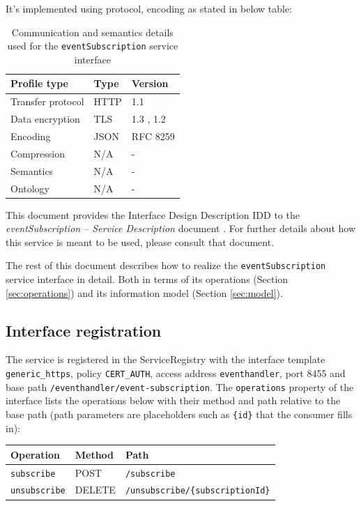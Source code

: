 \documentclass[a4paper]{arrowhead}
\begin{document}
It's implemented using protocol, encoding as stated in below table:
\begin{table}[ht!]
  \centering
  \begin{tabular}{|l|l|l|}
    \hline
    \rowcolor{gray!33} Profile type & Type & Version \\ \hline
    Transfer protocol & HTTP & 1.1 \cite{rfc9112} \\ \hline
    Data encryption & TLS & 1.3 \cite{rfc8446}, 1.2 \cite{rfc5246} \\ \hline
    Encoding & JSON & RFC 8259 \cite{rfc8259} \\ \hline
    Compression & N/A & - \\ \hline
    Semantics & N/A & - \\ \hline
    Ontology & N/A & - \\ \hline
  \end{tabular}
  \caption{Communication and semantics details used for the \texttt{eventSubscription} service interface}
  \label{tab:comunication_semantics_profile}
\end{table}

This document provides the Interface Design Description IDD to the \textit{eventSubscription -- Service Description} document \cite{eh-eventSubscription-sd}.
For further details about how this service is meant to be used, please consult that document.

The rest of this document describes how to realize the \texttt{eventSubscription} service
interface in detail. Both in terms of its operations (Section \ref{sec:operations}) and its information model (Section \ref{sec:model}).

\subsection{Interface registration}

The service is registered in the ServiceRegistry with the interface template \texttt{generic\_\allowbreak{}https}, policy \texttt{CERT\_\allowbreak{}AUTH}, access address \texttt{eventhandler}, port 8455 and base path \texttt{/\allowbreak{}eventhandler/\allowbreak{}event-\allowbreak{}subscription}. The \texttt{operations} property of the interface lists the operations below with their method and path relative to the base path (path parameters are placeholders such as \texttt{\{id\}} that the consumer fills in):

\noindent\begin{longtable}{| p{5.2cm} | p{1.6cm} | p{8.4cm} |} \hline
\rowcolor{gray!33} Operation & Method & Path \\ \hline \endhead
\texttt{subscribe} & POST & \texttt{/\allowbreak{}subscribe} \\ \hline
\texttt{unsubscribe} & DELETE & \texttt{/\allowbreak{}unsubscribe/\allowbreak{}\{subscription\allowbreak{}Id\}} \\ \hline
\end{longtable}
\end{document}
